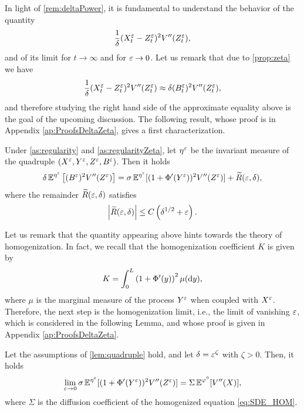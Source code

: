 \documentclass[review,onefignum,onetabnum]{siamonline190516}
\begin{document}
In light of \cref{rem:deltaPower}, it is fundamental to understand the behavior of the quantity
\begin{equation}
	\frac1\delta (X_t^\varepsilon - Z_t^\varepsilon)^2 V''(Z_t^\varepsilon),
\end{equation}
and of its limit for $t\to \infty$ and for $\varepsilon \to 0$. Let us remark that due to \cref{prop:zeta} we have
\begin{equation}
	\frac1\delta (X_t^\varepsilon - Z_t^\varepsilon)^2 V''(Z_t^\varepsilon) \approx \delta (B_t^\varepsilon)^2 V''(Z_t^\varepsilon),
\end{equation}
and therefore studying the right hand side of the approximate equality above is the goal of the upcoming discussion. The following result, whose proof is in Appendix \ref{ap:ProofsDeltaZeta}, gives a first characterization.

\begin{lemma} \label{lem:quadruple} Under \cref{as:regularity} and \cref{as:regularityZeta}, let $\eta^\varepsilon$ be the invariant measure of the quadruple $(X^\varepsilon, Y^\varepsilon, Z^\varepsilon, B^\varepsilon)$. Then it holds
	\begin{equation}
	\delta \operatorname{\mathbb{E}}^{\eta^\varepsilon} \left[ (B^\varepsilon)^2 V''(Z^\varepsilon)  \right] = \sigma \operatorname{\mathbb{E}}^{\eta^\varepsilon} [(1 + \Phi'(Y^\varepsilon))^2V''(Z^\varepsilon) ] + \widetilde R(\varepsilon,\delta),
	\end{equation}
	where the remainder $\widetilde R(\varepsilon,\delta)$ satisfies
	\begin{equation} \label{eq:quadruple_remainder}
	\left| \widetilde R(\epl,\delta) \right| \le C \left( \delta^{1/2} + \epl \right).
	\end{equation}
\end{lemma}

Let us remark that the quantity appearing above hints towards the theory of homogenization. In fact, we recall that the homogenization coefficient $K$ is given by
\begin{equation}
	K = \int_0^L \left(1 + \Phi'(y)\right)^2 \mu(\mathrm{d} y),
\end{equation}
where $\mu$ is the marginal measure of the process $Y^\varepsilon$ when coupled with $X^\varepsilon$. Therefore, the next step is the homogenization limit, i.e., the limit of vanishing $\varepsilon$, which is considered in the following Lemma, and whose proof is given in Appendix \ref{ap:ProofsDeltaZeta}.

\begin{lemma} \label{lem:quadruple_convergence} Let the assumptions of \cref{lem:quadruple} hold, and let $\delta = \varepsilon^\zeta$ with $\zeta > 0$. Then, it holds
	\begin{equation}
	\lim_{\varepsilon \to 0} \sigma \operatorname{\mathbb{E}}^{\eta^\varepsilon} [(1 + \Phi'(Y^\varepsilon))^2V''(Z^\varepsilon) ] = \Sigma \operatorname{\mathbb{E}}^{\varphi^0} [V''(X)],
	\end{equation}
	where $\Sigma$ is the diffusion coefficient of the homogenized equation \eqref{eq:SDE_HOM}.
\end{lemma}
\end{document}
